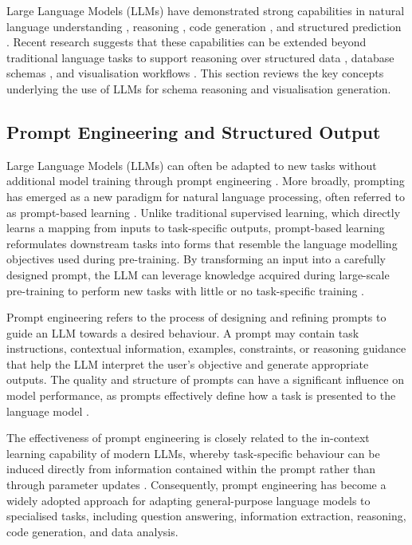 Large Language Models (LLMs) have demonstrated strong capabilities in natural language understanding \cite{brown2020language}, reasoning \cite{wei2022chain}, code generation \cite{chen2021evaluating}, and structured prediction \cite{wang2025gpt}. Recent research suggests that these capabilities can be extended beyond traditional language tasks to support reasoning over structured data \cite{ye2023large}, database schemas \cite{yu2018spider,gao2023text}, and visualisation workflows \cite{dibia2023lida}. This section reviews the key concepts underlying the use of LLMs for schema reasoning and visualisation generation.

\subsection{Prompt Engineering and Structured Output}

Large Language Models (LLMs) can often be adapted to new tasks without additional model training through prompt engineering \cite{brown2020language}. More broadly, prompting has emerged as a new paradigm for natural language processing, often referred to as prompt-based learning \cite{liu2023pre}. Unlike traditional supervised learning, which directly learns a mapping from inputs to task-specific outputs, prompt-based learning reformulates downstream tasks into forms that resemble the language modelling objectives used during pre-training. By transforming an input into a carefully designed prompt, the LLM can leverage knowledge acquired during large-scale pre-training to perform new tasks with little or no task-specific training \cite{liu2023pre}.

Prompt engineering refers to the process of designing and refining prompts to guide an LLM towards a desired behaviour. A prompt may contain task instructions, contextual information, examples, constraints, or reasoning guidance that help the LLM interpret the user's objective and generate appropriate outputs. The quality and structure of prompts can have a significant influence on model performance, as prompts effectively define how a task is presented to the language model \cite{liu2023pre}.

The effectiveness of prompt engineering is closely related to the in-context learning capability of modern LLMs, whereby task-specific behaviour can be induced directly from information contained within the prompt rather than through parameter updates \cite{brown2020language}. Consequently, prompt engineering has become a widely adopted approach for adapting general-purpose language models to specialised tasks, including question answering, information extraction, reasoning, code generation, and data analysis.

